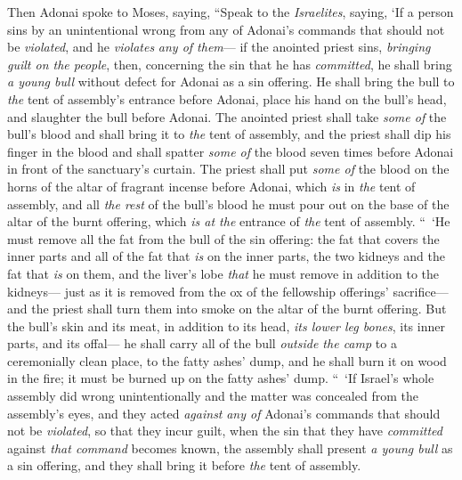 \begin{biblechapter} %
 Then Adonai spoke to Moses, saying,
\verse “Speak to the \textit{Israelites}, saying, ‘If a person sins by an unintentional wrong from any of Adonai’s commands that should not be \textit{violated}, and he \textit{violates} \textit{any of them}—
\verse if the anointed priest sins, \textit{bringing guilt on the people}, then, concerning the sin that he has \textit{committed}, he shall bring \textit{a young bull} without defect for Adonai as a sin offering.
\verse He shall bring the bull to \textit{the} tent of assembly’s entrance before Adonai, place his hand on the bull’s head, and slaughter the bull before Adonai.
\verse The anointed priest shall take \textit{some of} the bull’s blood and shall bring it to \textit{the} tent of assembly,
\verse and the priest shall dip his finger in the blood and shall spatter \textit{some of} the blood seven times before Adonai in front of the sanctuary’s curtain.
\verse The priest shall put \textit{some of} the blood on the horns of the altar of fragrant incense before Adonai, which \textit{is} in \textit{the} tent of assembly, and all \textit{the rest} of the bull’s blood he must pour out on the base of the altar of the burnt offering, which \textit{is at the} entrance of \textit{the} tent of assembly.
\verse “ ‘He must remove all the fat from the bull of the sin offering: the fat that covers the inner parts and all of the fat that \textit{is} on the inner parts,
\verse the two kidneys and the fat that \textit{is} on them, and the liver’s lobe \textit{that} he must remove in addition to the kidneys—
\verse just as it is removed from the ox of the fellowship offerings’ sacrifice—and the priest shall turn them into smoke on the altar of the burnt offering.
\verse But the bull’s skin and its meat, in addition to its head, \textit{its lower leg bones}, its inner parts, and its offal—
\verse he shall carry all of the bull \textit{outside the camp} to a ceremonially clean place, to the fatty ashes’ dump, and he shall burn it on wood in the fire; it must be burned up on the fatty ashes’ dump.
\verse “ ‘If Israel’s whole assembly did wrong unintentionally and the matter was concealed from the assembly’s eyes, and they acted \textit{against} \textit{any of} Adonai’s commands that should not be \textit{violated}, so that they incur guilt,
\verse when the sin that they have \textit{committed} against \textit{that command} becomes known, the assembly shall present \textit{a young bull} as a sin offering, and they shall bring it before \textit{the} tent of assembly.

\end{biblechapter}
